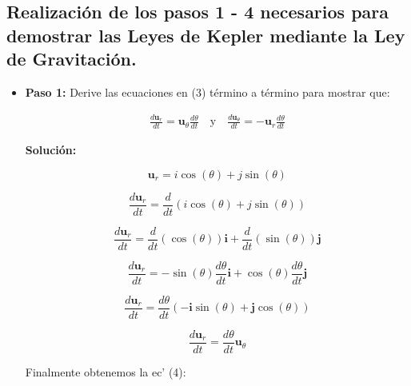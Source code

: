 \documentclass{article}
\begin{document}
	\subsection{Realización de los pasos 1 - 4 necesarios para demostrar las Leyes de Kepler mediante la Ley de Gravitación.}
	\begin{itemize}
		\item \textbf{Paso 1:} Derive las ecuaciones en (3) término a término para mostrar que:
		
		\begin{equation} 
			\begin{aligned}
				\frac{d \mathbf{u}_r}{dt} = \mathbf{u}_\theta \frac{d\theta}{dt} \quad \text{y} \quad \frac{d \mathbf{u}_\theta}{dt} = \mathbf{-u}_r \frac{d\theta}{dt}
		    \end{aligned}
	   \end{equation} 
		
		\textbf{Solución:}
		
		\begin{equation*} 
			\mathbf{u}_r = i \cos(\theta) + j \sin(\theta) \tag{3}
		\end{equation*}
		
		\begin{equation*} 
			\frac{d \mathbf{u}_r}{dt} = \frac{d}{dt} \left( i \cos(\theta) + j \sin(\theta) \right)
		\end{equation*} 
		
		\begin{equation*}
			\frac{d \mathbf{u}_r}{dt} = \frac{d}{dt} \left( \cos(\theta) \right) \mathbf{i} + \frac{d}{dt} \left( \sin(\theta) \right) \mathbf{j}
		\end{equation*}
		
		\begin{equation*}
			\frac{d \mathbf{u}_r}{dt} = -\sin(\theta) \frac{d\theta}{dt} \mathbf{i} + \cos(\theta) \frac{d\theta}{dt} \mathbf{j}
		\end{equation*}
		
		\begin{equation*}
			\frac{d \mathbf{u}_r}{dt} = \frac{d\theta}{dt} \left( - \mathbf{i} \sin(\theta) + \mathbf{j} \cos(\theta) \right)
		\end{equation*}
		
		\begin{equation*}
			\frac{d \mathbf{u}_r}{dt} = \frac{d\theta}{dt} \mathbf{u}_\theta
		\end{equation*}
		
		Finalmente obtenemos la ec' (4):
		

\end{itemize}
\end{document}
